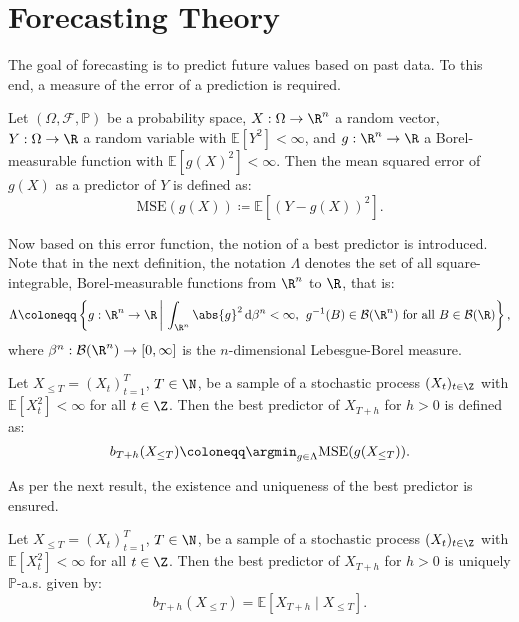 \newpage
\section{Forecasting Theory}
The goal of forecasting is to predict future values based on past data. To this end, a measure of the error of a prediction is required.
\begin{defn}
Let $(\Omega,\mathcal{F},\mathbb{P})$ be a probability space, $X:\Omega\to\R^{n}$ a random vector, $Y:\Omega\to\R$ a random variable with $\mathbb{E}[Y^{2}]<\infty$, and $g:\R^{n}\to\R$ a Borel-measurable function with $\mathbb{E}[g(X)^{2}]<\infty$. Then the mean squared error of $g(X)$ as a predictor of $Y$ is defined as:
\begin{equation}
    \mathrm{MSE}(g(X))\coloneqq\mathbb{E}\left[(Y-g(X))^{2}\right].
\end{equation}
\end{defn}
Now based on this error function, the notion of a best predictor is introduced. Note that in the next definition, the notation $\Lambda$ denotes the set of all square-integrable, Borel-measurable functions from $\R^{n}$ to $\R$, that is:
\begin{equation*}
    \Lambda\coloneqq\left\{g:\R^{n}\to \R \,\bigg|\, \int_{\R^{n}}\abs{g}^{2}\,\mathrm{d}\beta^{n}<\infty,\hspace{4pt}\textrm{$g^{-1}(B)\in\mathcal{B}(\R^{n})$ for all $B\in\mathcal{B}(\R)$}\right\},
\end{equation*}
where $\beta^{n}:\mathcal{B}(\R^{n})\to[0,\infty]$ is the $n$-dimensional Lebesgue-Borel measure.
\begin{defn}
Let $X_{\leq T}=(X_{t})_{t=1}^{T}$, $T\in\N$, be a sample of a stochastic process $(X_{t})_{t\in\Z}$ with $\mathbb{E}[X_{t}^{2}]<\infty$ for all $t\in\Z$. Then the best predictor of $X_{T+h}$ for $h>0$ is defined as:
\begin{equation}
    b_{T+h}(X_{\leq T})\coloneqq\argmin_{g\in\Lambda}\mathrm{MSE}(g(X_{\leq T})).
\end{equation}
\end{defn}
As per the next result, the existence and uniqueness of the best predictor is ensured.
\begin{prop}
Let $X_{\leq T}=(X_{t})_{t=1}^{T}$, $T\in\N$, be a sample of a stochastic process $(X_{t})_{t\in\Z}$ with $\mathbb{E}[X_{t}^{2}]<\infty$ for all $t\in\Z$. Then the best predictor of $X_{T+h}$ for $h>0$ is uniquely $\mathbb{P}$-a.s. given by:
\begin{equation}
    b_{T+h}(X_{\leq T})=\mathbb{E}[X_{T+h}\mid X_{\leq T}].
\end{equation}
\end{prop}
